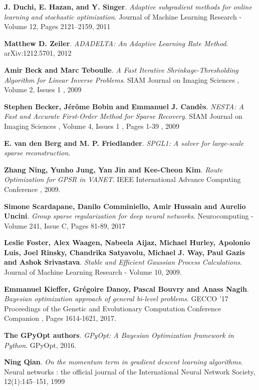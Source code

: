 \documentclass[12pt]{report}
\begin{document}
\begin{thebibliography}{9}
\textbf{J. Duchi, E. Hazan, and Y. Singer}.
\textit{Adaptive subgradient methods for online learning and stochastic optimization}. 
 Journal of Machine Learning Research - Volume 12, Pages 2121--2159, 2011
 
\textbf{Matthew D. Zeiler}.
\textit{ADADELTA: An Adaptive Learning Rate Method}. 
arXiv:1212.5701, 2012

\textbf{Amir Beck and Marc Teboulle}.
\textit{A Fast Iterative Shrinkage-Thresholding Algorithm for Linear Inverse Problems}. 
SIAM Journal on Imaging Sciences , Volume 2, Issues 1 , 2009

\textbf{Stephen Becker, Jérôme Bobin and Emmanuel J. Candès}.
\textit{NESTA: A Fast and Accurate First-Order Method for Sparse Recovery}. 
SIAM Journal on Imaging Sciences , Volume 4, Issues 1 , Pages 1-39 , 2009

\textbf{E. van den Berg and M. P. Friedlander}.
\textit{SPGL1: A solver for large-scale sparse reconstruction}. 

\textbf{Zhang Ning, Yunho Jung, Yan Jin and Kee-Cheon Kim}.
\textit{Route Optimization for GPSR in VANET}.
IEEE International Advance Computing Conference , 2009.

\textbf{Simone Scardapane, Danilo Comminiello, Amir Hussain and Aurelio Uncini}.
\textit{Group sparse regularization for deep neural networks}.
Neurocomputing - Volume 241, Issue C, Pages 81-89, 2017

\newpage

\textbf{Leslie Foster, Alex Waagen, Nabeela Aijaz, Michael Hurley, Apolonio Luis, Joel Rinsky, 
Chandrika Satyavolu, Michael J. Way, Paul Gazis and Ashok Srivastava}.
\textit{Stable and Efficient Gaussian Process Calculations}.
Journal of Machine Learning Research - Volume 10, 2009.

\textbf{Emmanuel Kieffer, Grégoire Danoy, Pascal Bouvry and Anass Nagih}.
\textit{Bayesian optimization approach of general bi-level problems}.
GECCO '17 Proceedings of the Genetic and Evolutionary Computation Conference Companion , Pages 1614-1621, 2017.

\textbf{The GPyOpt authors}.
\textit{GPyOpt: A Bayesian Optimization framework in Python}.
GPyOpt, 2016.

\textbf{Ning Qian}.
\textit{On the momentum term in gradient descent learning algorithms}.
Neural networks : the official journal of the International Neural Network Society, 12(1):145–151, 1999


\end{thebibliography}
\end{document}
